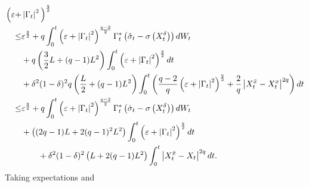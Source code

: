 \documentclass[11pt]{amsart}
\theoremstyle{plain}
\def \dd{{\rm d}}
\numberwithin{equation}{section}
\begin{document}
\begin{equation}\label{eq useful semiconc SDE estimate}
\begin{aligned}
 \Big(\varepsilon+&\left|\Gamma_{t}\right|^{2}\Big)^{\frac{q}{2}}  \\
 \leq  &  
 \varepsilon^{\frac q 2}   +q \int_{0}^{t}\left(\varepsilon+\left|\Gamma_{t}\right|^2 \right)^{\frac{q-2}{2}} \Gamma_{t}^{*}\left(\hat{\sigma}_{t}-\sigma\left(X_{t}^{\delta}\right)\right) \dd W_{t} \\
& + q \left(\frac{3}{2} L+(q-1) L^{2}\right) \int_{0}^{t} \left(\varepsilon+\left|\Gamma_{t}\right|^{2}\right)^{\frac{q}{2}}  \dd t \\
& + \delta^2(1-\delta)^2 q\left(\frac{L}{2}+(q-1) L^{2}\right) \int_0^t \left( \frac{q-2}{q}  \left(\varepsilon+\left|\Gamma_{t}\right|^{2}\right)^{\frac{q}{2}}+\frac{2}{q} \left|X_{t}^{\bar{x}}-X_{t}^{x}\right|^{2 q}\right) \dd t  \\
\leq & \varepsilon^{\frac q 2} +q \int_{0}^{t}\left(\varepsilon+\left|\Gamma_{t}\right|^2 \right)^{\frac{q-2}{2}} \Gamma_{t}^{*}\left(\hat{\sigma}_{t}-\sigma\left(X_{t}^{\delta}\right)\right) \dd W_{t} \\ 
& +\left((2 q-1) L+2(q-1)^{2} L^{2}\right) \int_{0}^{t}  \left(\varepsilon+\left|\Gamma_{t}\right|^{2}\right)^{\frac{q}{2}} \dd t \\ 
& \quad \quad + \delta^2(1-\delta)^2 \left(L+2(q-1) L^{2}\right) \int_{0}^{t}  \left|X_{t}^{\bar{x}}-X_{t}\right|^{2 q}  \dd t.
\end{aligned}
\end{equation}
Taking expectations and %
\end{document}
